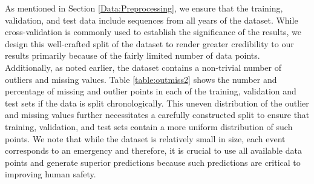 As mentioned in Section \ref{Data:Preprocessing}, we ensure that the training, validation, and test data include sequences from all years of the dataset. While cross-validation is commonly used to establish the significance of the results, we design this well-crafted split of the dataset to render greater credibility to our results primarily because of the fairly limited number of data points. Additionally, as noted earlier, the dataset contains a non-trivial number of outliers and missing values.  Table \ref{table:outmiss2} shows the number and  percentage of missing and outlier points in each of the training, validation and test sets if the data is split chronologically. This uneven distribution of the outlier and missing values further necessitates a carefully constructed split to ensure that training, validation, and test sets contain a more uniform distribution of such points. We note that while the dataset is relatively small in size, each event corresponds to an emergency and therefore, it is crucial to use all available data points and generate superior predictions because such predictions are critical to improving human safety. 



\begin{table}[!ht]
\centering
{}
\caption{Statistics of Outliers and Missing values in a Chronological Split}
\label{table:outmiss2}
\vspace{-5mm}
\end{table}




